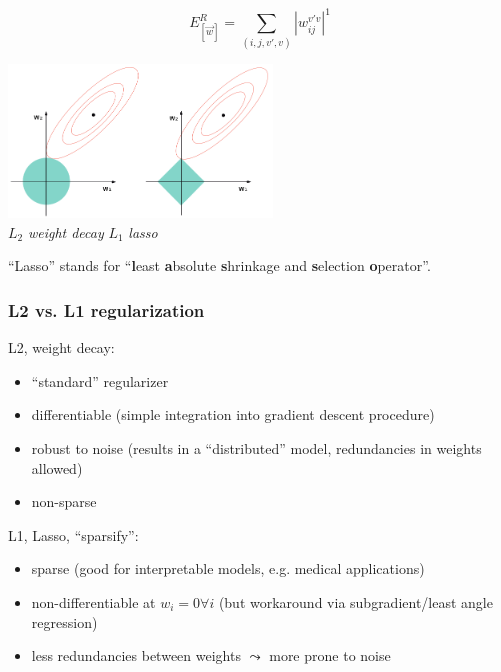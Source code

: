 \begin{frame}\frametitle{\subsecname}

	\begin{equation}
		E^R_{[\vec w]} = \sum\limits_{(i, j, v', v)} {|w_{ij}^{v'v}|}^1
	\end{equation}
	
	\begin{center}
		\includegraphics[width=7cm]{img/RegularizationTypesIntersect_clean.png} \\[-2mm]
		{ \footnotesize $L_2$ {\em weight decay}
			\hspace{1cm} $L_1$ {\em lasso}\hspace{1cm} $ $}
	\end{center}
	
	``Lasso'' stands for ``\textbf{l}east \textbf{a}bsolute \textbf{s}hrinkage and \textbf{s}election \textbf{o}perator''.


\end{frame}

\begin{frame}\frametitle{L2 vs. L1 regularization}

L2, weight decay:
\begin{itemize}
\item ``standard'' regularizer
\item differentiable (simple integration into gradient descent procedure)
\item robust to noise (results in a ``distributed'' model, redundancies in weights allowed)
\item non-sparse
\end{itemize}

\pause

L1, Lasso, ``sparsify'':

\begin{itemize}
\item sparse (good for interpretable models, e.g. medical applications)
\item non-differentiable at $w_i = 0 \forall i$ (but workaround via subgradient/least angle regression)
\item less redundancies between weights $\leadsto$ more prone to noise
\end{itemize}


\end{frame}

